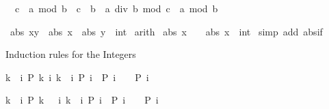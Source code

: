 \begin{isabellebody}
\begin{isamarkuptext}
\begin{isabelle}%
{}\ {\isacharless}\ c\ {\isasymLongrightarrow}\ a\ mod\ {\isacharparenleft}b\ {\isacharasterisk}\ c{\isacharparenright}\ {\isacharequal}\ b\ {\isacharasterisk}\ {\isacharparenleft}a\ div\ b\ mod\ c{\isacharparenright}\ {\isacharplus}\ a\ mod\ b%
\end{isabelle}
%
\end{isamarkuptext}%
\isamarkuptrue%
\isamarkupfalse%
\ {\isachardoublequoteopen}abs\ {\isacharparenleft}x{\isacharplus}y{\isacharparenright}\ {\isasymle}\ abs\ x\ {\isacharplus}\ abs\ {\isacharparenleft}y\ {\isacharcolon}{\isacharcolon}\ int{\isacharparenright}{\isachardoublequoteclose}\isanewline
%
\isadelimproof
%
\endisadelimproof
%
\isatagproof
{}\isamarkupfalse%
\ arith%
\endisatagproof
{\isafoldproof}%
%
\isadelimproof
\isanewline
%
\endisadelimproof
\isanewline
{}\isamarkupfalse%
\ {\isachardoublequoteopen}abs\ {\isacharparenleft}{}{\isacharasterisk}x{\isacharparenright}\ {\isacharequal}\ {}\ {\isacharasterisk}\ abs\ {\isacharparenleft}x\ {\isacharcolon}{\isacharcolon}\ int{\isacharparenright}{\isachardoublequoteclose}\isanewline
%
\isadelimproof
%
\endisadelimproof
%
\isatagproof
{}\isamarkupfalse%
\ {\isacharparenleft}simp\ add{\isacharcolon}\ abs{\isacharunderscore}if{\isacharparenright}%
\endisatagproof
{\isafoldproof}%
%
\isadelimproof
%
\endisadelimproof
%
\begin{isamarkuptext}%
Induction rules for the Integers

\begin{isabelle}%
{\isasymlbrakk}k\ {\isasymle}\ i{\isacharsemicolon}\ P\ k{\isacharsemicolon}\ {\isasymAnd}i{\isachardot}\ {\isasymlbrakk}k\ {\isasymle}\ i{\isacharsemicolon}\ P\ i{\isasymrbrakk}\ {\isasymLongrightarrow}\ P\ {\isacharparenleft}i\ {\isacharplus}\ {}{\isacharparenright}{\isasymrbrakk}\ {\isasymLongrightarrow}\ P\ i%
\end{isabelle}

\begin{isabelle}%
{\isasymlbrakk}k\ {\isacharless}\ i{\isacharsemicolon}\ P\ {\isacharparenleft}k\ {\isacharplus}\ {}{\isacharparenright}{\isacharsemicolon}\ {\isasymAnd}i{\isachardot}\ {\isasymlbrakk}k\ {\isacharless}\ i{\isacharsemicolon}\ P\ i{\isasymrbrakk}\ {\isasymLongrightarrow}\ P\ {\isacharparenleft}i\ {\isacharplus}\ {}{\isacharparenright}{\isasymrbrakk}\ {\isasymLongrightarrow}\ P\ i%
\end{isabelle}


\end{isamarkuptext}
\end{isabellebody}
